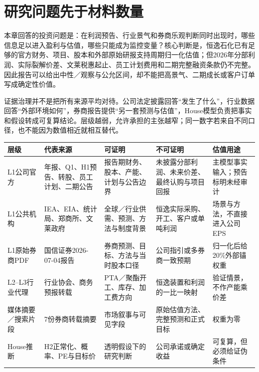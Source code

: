 \section{研究问题先于材料数量}

本章回答的投资问题是：在利润预告、行业景气和券商乐观判断同时出现时，哪些信息足以进入盈利与估值，哪些只能成为监控变量？核心判断是，恒逸石化已有足够的官方财务、项目、股本和外部原始研报支持周期归一化估值；但2026年分部利润、实际裂解价差、文莱税惠起止、员工计划费用和二期完整融资条款仍不完整。因此报告可以给出中性／观察与公允区间，却不能把高景气、二期成长或客户订单写成确定性价值。

证据治理并不是把所有来源平均对待。公司法定披露回答“发生了什么”，行业数据回答“外部环境如何”，券商报告提供“另一套预测与估值”，House模型负责把事实和假设转成可复算结论。层级越弱，允许承担的主张越窄；同一数字若来自不同口径，也不能因为数值相近就相互替代。

\begin{exhibitbox}[证据层级与允许用途]
\small
\noindent\begin{tabularx}{\textwidth}{L{2.25cm}L{2.6cm}L{2.8cm}L{2.6cm}X}
\toprule
\textbf{层级} & \textbf{代表来源} & \textbf{可证明} & \textbf{不可证明} & \textbf{估值用途} \\
\midrule
L1公司官方 & 年报、Q1、H1预告、转股、员工计划、二期公告 & 报告期财务、股本、产能、计划与公告边界 & 未披露分部利润、未来价差、最终认购与项目回报 & 主模型事实输入；预告标明未经审计 \\
L1公共机构 & IEA、EIA、统计局、郑商所、文莱政府 & 全球／行业供需、预测、方法与制度背景 & 恒逸实际采购、开工、客户或单吨利润 & 场景与方法，不直接进入公司EPS \\
L1原始券商PDF & 国信证券2026-07-04报告 & 券商预测、目标、方法与当时股本口径 & 公司指引或多券商一致预期 & 归一化后给20\%外部锚权重 \\
L2--L3行业代理 & 行业协会、商务预报转载 & PTA／聚酯开工、库存、加工费方向 & 恒逸装置和利润的一比一映射 & 验证情景，不作产能乘价差 \\
媒体摘要／搜索片段 & 7份券商转载摘要 & 市场叙事与可见字段 & 原始估值方法、完整预测和正式目标 & 权重为零 \\
House推断 & H2正常化、概率、PE与目标价 & 透明假设下的研究判断 & 公司承诺或确定收益 & 可复算，但必须给证伪条件 \\
\bottomrule
\end{tabularx}
\end{exhibitbox}

